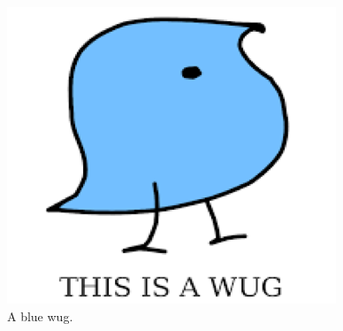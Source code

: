 \documentclass[11pt, letterpaper]{article}
\begin{document}
\begin{figure}[ht] \center
    \includegraphics[scale=1]{./wug.png}
      \caption{A blue wug.}
    \label{wug}
\end{figure}
\end{document}
